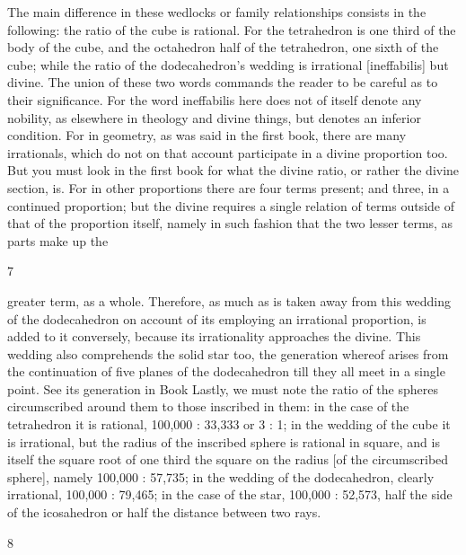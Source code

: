 \documentclass{article}
\begin{document}
The main difference in these wedlocks or family relationships consists in
the following: the ratio of the cube is rational. For the tetrahedron is one
third of the body of the cube, and the octahedron half of the tetrahedron,
one sixth of the cube; while the ratio of the dodecahedron's wedding
is irrational [ineffabilis] but divine.
The union of these two words commands the reader to be careful as to
their significance. For the word ineffabilis here does not of itself denote
any nobility, as elsewhere in theology and divine things, but denotes an
inferior condition. For in geometry, as was said in the first book, there
are many irrationals, which do not on that account participate in a divine
proportion too. But you must look in the first book for what the divine
ratio, or rather the divine section, is. For in other proportions there are
four terms present; and three, in a continued proportion; but the divine
requires a single relation of terms outside of that of the proportion itself,
namely in such fashion that the two lesser terms, as parts make up the


7

greater term, as a whole. Therefore, as much as is taken away from this
wedding of the dodecahedron on account of its employing an irrational
proportion, is added to it conversely, because its irrationality approaches
the divine. This wedding also comprehends the solid star too, the
generation whereof arises from the continuation of five planes of the
dodecahedron till they all meet in a single point. See its generation in
Book
Lastly, we must note the ratio of the spheres circumscribed around them
to those inscribed in them: in the case of the tetrahedron it is rational,
100,000 : 33,333 or 3 : 1; in the wedding of the cube it is irrational, but
the radius of the inscribed sphere is rational in square, and is itself the
square root of one third the square on the radius [of the circumscribed
sphere], namely 100,000 : 57,735; in the wedding of the dodecahedron,
clearly irrational, 100,000 : 79,465; in the case of the star, 100,000 :
52,573, half the side of the icosahedron or half the distance between two
rays.


8
\end{document}
